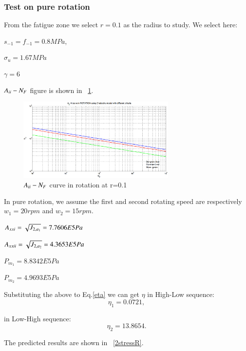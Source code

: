 \documentclass[3p,times,procedia,number]{elsarticle}
\newcommand{\figref}[1]{\figurename~\ref{#1}}
\begin{document}
\newpage
\subsubsection{Test on pure rotation}

From the fatigue zone we select $r=0.1$ as the radius to study. We select here:

$s_{-1}=f_{-1}=0.8MPa$,

$\sigma_{u}=1.67MPa$ 

$\gamma=6$


$A_{\uppercase\expandafter{\romannumeral2}}-N_F$ figure is shown in \figref{JNrotation}. 
\begin{figure}[h!]
	\centering
	\includegraphics[width=0.7\textwidth]{figures//JNrotation.png} 
	\caption{$A_{\uppercase\expandafter{\romannumeral2}}-N_F$ curve in rotation at r=0.1}
	\label{JNrotation}
\end{figure}

In pure rotation, we assume the first and second rotating speed are respectively $w_1=20rpm$ and $w_2=15rpm$.  

\vspace{6pt}
$A_{\uppercase\expandafter{\romannumeral2}1}=\sqrt{J_{2,a_1}}=7.7606E5 Pa$

\vspace{6pt}
$A_{\uppercase\expandafter{\romannumeral2}2}=\sqrt{J_{2,a_2}}=4.3653E5 Pa$

\vspace{6pt}
$P_{m_1}=8.8342E5 Pa$

\vspace{6pt}
$P_{m_2}=4.9693E5 Pa$

Substituting the above to Eq.\eqref{eta} we can get $\eta$ in High-Low sequence:
$$\eta_1=0.0721,$$

in Low-High sequence:
$$\eta_2=13.8654.$$

The predicted results are shown in \figref{2stressR}.
\end{document}
